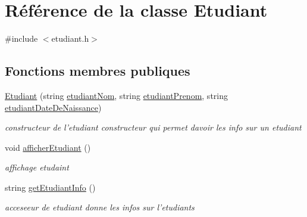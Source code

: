 \hypertarget{class_etudiant}{\section{Référence de la classe Etudiant}
\label{class_etudiant}
}


{\ttfamily \#include $<$etudiant.\+h$>$}

\subsection*{Fonctions membres publiques}
\begin{DoxyCompactItemize}
\item 
\hyperlink{class_etudiant_ad630e6a49ae2f8c385940e1ee1389436}{Etudiant} (string \hyperlink{class_etudiant_a78fe5201de800a14f55e447ca9546735}{etudiant\+Nom}, string \hyperlink{class_etudiant_adf6ae4956a327bc5d452f91c317ede35}{etudiant\+Prenom}, string \hyperlink{class_etudiant_af8ecd916d5c444e51292942cff1207d7}{etudiant\+Date\+De\+Naissance})
\begin{DoxyCompactList}\small\item\em constructeur de l'etudiant constructeur qui permet davoir les info sur un etudiant \end{DoxyCompactList}\item 
void \hyperlink{class_etudiant_a698a8265bff713dec62d00da4a532284}{afficher\+Etudiant} ()
\begin{DoxyCompactList}\small\item\em affichage etudaint \end{DoxyCompactList}\item 
string \hyperlink{class_etudiant_a6cf705351e88975e2fe5572b3c2d6035}{get\+Etudiant\+Info} ()
\begin{DoxyCompactList}\small\item\em acceseeur de etudiant donne les infos sur l'etudiants \end{DoxyCompactList}\end{DoxyCompactItemize}
